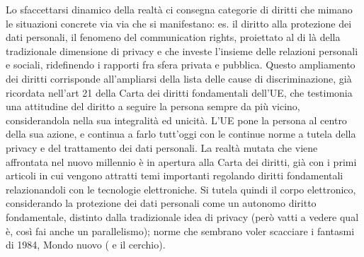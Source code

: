 Lo sfaccettarsi dinamico della realtà ci consegna categorie di diritti che mimano le situazioni concrete via via che si manifestano: es. il diritto alla protezione dei dati personali, il fenomeno del communication rights, proiettato al di là della tradizionale dimensione di privacy e che investe l’insieme delle relazioni personali e sociali, ridefinendo i rapporti fra sfera privata e pubblica. Questo ampliamento dei diritti corrisponde all’ampliarsi della lista delle cause di discriminazione, già ricordata nell’art 21 della Carta dei diritti fondamentali dell’UE, che testimonia una attitudine del diritto a seguire la persona sempre da più vicino, considerandola nella sua integralità ed unicità.
L’UE pone la persona al centro della sua azione, e continua a farlo tutt’oggi con le continue norme a tutela della privacy e del trattamento dei dati personali.
La realtà mutata che viene affrontata nel nuovo millennio è in apertura alla Carta dei diritti, già con i primi articoli in cui vengono attratti temi importanti regolando diritti fondamentali relazionandoli con le tecnologie elettroniche.
Si tutela quindi il corpo elettronico, considerando  la protezione dei dati personali come un autonomo diritto fondamentale, distinto dalla tradizionale idea di privacy (però vatti a vedere qual è, così fai anche  un parallelismo); norme che sembrano voler scacciare i fantasmi di 1984, Mondo nuovo ( e il cerchio).

